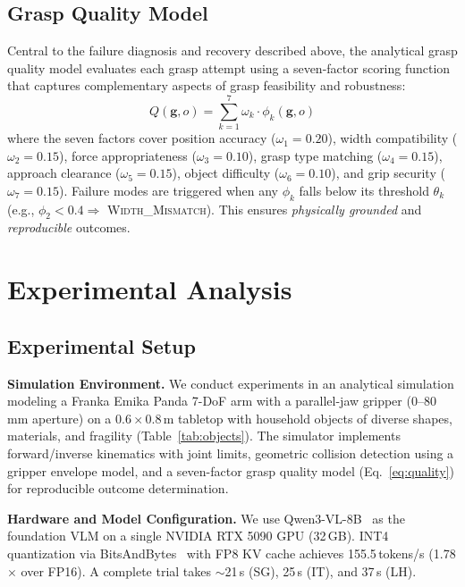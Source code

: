 \documentclass[letterpaper, 10pt, conference]{ieeeconf}
\begin{document}
\subsection{Grasp Quality Model}
\label{sec:quality}

Central to the failure diagnosis and recovery described above, the analytical grasp quality model evaluates each grasp attempt using a seven-factor scoring function that captures complementary aspects of grasp feasibility and robustness:
\begin{equation}
    Q(\mathbf{g}, o) = \sum_{k=1}^{7} \omega_k \cdot \phi_k(\mathbf{g}, o)
    \label{eq:quality}
\end{equation}
where the seven factors cover position accuracy ($\omega_1{=}0.20$), width compatibility ($\omega_2{=}0.15$), force appropriateness ($\omega_3{=}0.10$), grasp type matching ($\omega_4{=}0.15$), approach clearance ($\omega_5{=}0.15$), object difficulty ($\omega_6{=}0.10$), and grip security ($\omega_7{=}0.15$).
Failure modes are triggered when any $\phi_k$ falls below its threshold $\theta_k$ (e.g., $\phi_2 < 0.4 \Rightarrow$ \textsc{Width\_Mismatch}).
This ensures \emph{physically grounded} and \emph{reproducible} outcomes.

\section{Experimental Analysis}
\label{sec:experiments}

\subsection{Experimental Setup}
\label{sec:setup}

\textbf{Simulation Environment.}
We conduct experiments in an analytical simulation modeling a Franka Emika Panda 7-DoF arm with a parallel-jaw gripper (0--80\,mm aperture) on a $0.6 \times 0.8$\,m tabletop with household objects of diverse shapes, materials, and fragility (Table~\ref{tab:objects}).
The simulator implements forward/inverse kinematics with joint limits, geometric collision detection using a gripper envelope model, and a seven-factor grasp quality model (Eq.~\ref{eq:quality}) for reproducible outcome determination.

\textbf{Hardware and Model Configuration.}
We use Qwen3-VL-8B~\cite{bai2025qwen3} as the foundation VLM on a single NVIDIA RTX 5090 GPU (32\,GB).
INT4 quantization via BitsAndBytes~\cite{dettmers2024bnb} with FP8 KV cache achieves 155.5\,tokens/s (1.78$\times$ over FP16).
A complete trial takes $\sim$21\,s (SG), 25\,s (IT), and 37\,s (LH).
\end{document}

